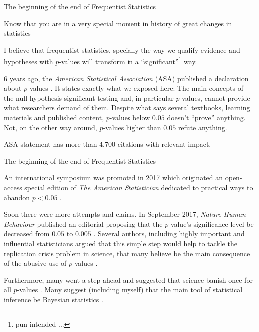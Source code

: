\begin{frame}{The beginning of the end of Frequentist Statistics}
	\begin{vfilleditems}
		\small
		\item Know that you are in a very special moment in history of great changes in statistics
		\item I believe that frequentist statistics, specially the way we qualify evidence and hypotheses with
		$p$-values will transform in a ``significant''\footnote{pun intended ...} way.
		\item 6 years ago, the \textit{American Statistical Association} (ASA) published a declaration about
		$p$-values \parencite{Wasserstein2016}.
		It states exactly what we exposed here:
		The main concepts of the null hypothesis significant testing and,
		in particular $p$-values, cannot provide what researchers demand of them.
		Despite what says several textbooks, learning materials and published content,
		$p$-values below $0.05$ doesn't ``prove'' anything.
		Not, on the other way around, $p$-values higher than $0.05$ refute anything.
		\item ASA statement has more than 4.700 citations with relevant impact.
	\end{vfilleditems}
\end{frame}

\begin{frame}{The beginning of the end of Frequentist Statistics}
	\begin{vfilleditems}
		\small
		\item An international symposium was promoted in 2017 which originated an open-access special edition of
		\textit{The American Statistician} dedicated to practical ways to abandon $p < 0.05$
		\parencite{wassersteinMovingWorld052019}.
		\item Soon there were more attempts and claims.
		In September 2017, \textit{Nature Human Behaviour} published an editorial proposing that the $p$-value's
		significance level be decreased from $0.05$ to $0.005$ \parencite{benjaminRedefineStatisticalSignificance2018}.
		Several authors, including highly important and influential statisticians argued that this simple step would
		help to tackle the replication crisis problem in science, that many believe be the main consequence
		of the abusive use of $p$-values \parencite{Ioannidis2019}.
		\item Furthermore, many went a step ahead and suggested that science banish once for all $p$-values
		\parencite{ItTimeTalk2019,lakensJustifyYourAlpha2018}.
		Many suggest (including myself) that the main tool of statistical inference
		be Bayesian statistics \parencite{amrheinScientistsRiseStatistical2019, Goodman1180, vandeschootBayesianStatisticsModelling2021}.
	\end{vfilleditems}
\end{frame}
